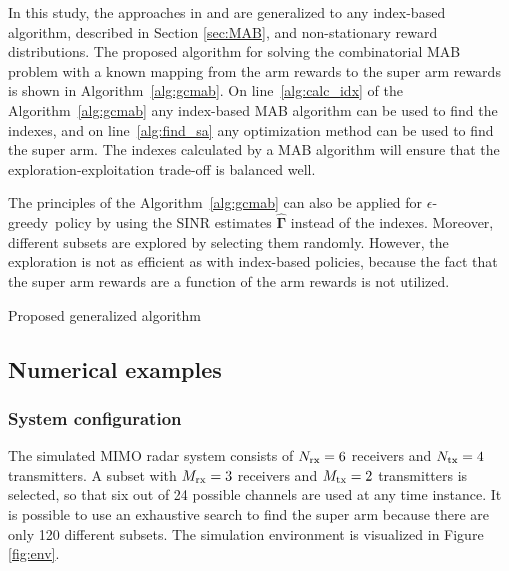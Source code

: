 \documentclass[english, 12pt, a4paper, elec, utf8, a-1b, online]{aaltothesis}
\newcommand{\egreedy}{$\epsilon$-greedy~}
\newcommand{\vsinrb}{\widehat{\boldsymbol{\Gamma}}}
\begin{document}
In this study, the approaches in \cite{Mukherjee2012} and \cite{Kuai2019} are generalized to any index-based algorithm, described in Section \ref{sec:MAB}, and non-stationary reward distributions. 
The proposed algorithm for solving the combinatorial MAB problem with a known mapping from the arm rewards to the super arm rewards is shown in Algorithm~\ref{alg:gcmab}.
On line~\ref{alg:calc_idx} of the Algorithm~\ref{alg:gcmab} any index-based MAB algorithm can be used to find the indexes, and on line~\ref{alg:find_sa} any optimization method can be used to find the super arm.
The indexes calculated by a MAB algorithm will ensure that the exploration-exploitation trade-off is balanced well.

The principles of the Algorithm~\ref{alg:gcmab} can also be applied for \egreedy policy by using the SINR estimates $\vsinrb$ instead of the indexes.
Moreover, different subsets are explored by selecting them randomly.
However, the exploration is not as efficient as with index-based policies, because the fact that the super arm rewards are a function of the arm rewards is not utilized.

\begin{algorithm}[h]
\SetAlgoLined
{}
\caption{Proposed generalized algorithm}
\label{alg:gcmab}
\end{algorithm}

\subsection{Numerical examples}
\label{sec:sim}


\subsubsection{System configuration}
\label{sec:sys_conf}
The simulated MIMO radar system consists of ${N_{\text{rx}}}=6$ receivers and ${N_{\text{tx}}}=4$ transmitters.
A subset with ${M_{\text{rx}}}=3$ receivers and ${M_{\text{tx}}}=2$ transmitters is selected, so that six out of 24 possible channels are used at any time instance.
It is possible to use an exhaustive search to find the super arm because there are only 120 different subsets.
The simulation environment is visualized in Figure \ref{fig:env}.
\end{document}
